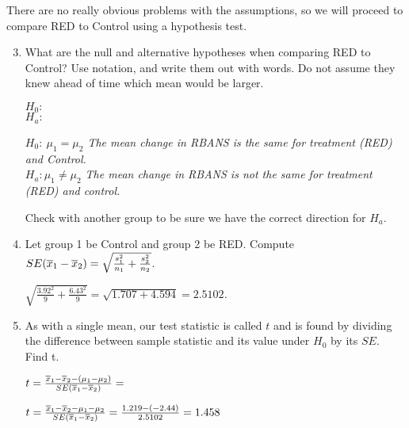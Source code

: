 There are no really obvious problems with the assumptions, so we will
proceed to compare RED to Control  using a hypothesis test.

\begin{enumerate}
\setcounter{enumi}{2}

\item  What are the null and alternative hypotheses when comparing RED
  to Control? Use notation, and write them out with words.
  Do not assume they knew ahead of time which  mean would be
  larger. \\
\begin{students}
 $H_0:$    \vspace{1cm}    \\ $H_a:$    \vspace{1cm}
\end{students}
\begin{key}
  {\it   $H_0:\ \mu_1 = \mu_2$ The mean change in RBANS is the same
    for treatment (RED) and Control.    \\ $H_a: \mu_1 \neq \mu_2$ The
    mean change in RBANS is not the same for treatment (RED) and control.  }
\end{key}

   Check with another group to be sure we have the correct
   direction for $H_a$.

\item  Let group 1 be Control and group 2 be RED. Compute $SE(\overline{x}_1 -
  \overline{x}_2) = \sqrt{\frac{s_1^2}{n_1} +     \frac{s_2^2}{n_2}}$. 
\begin{students}
    \vspace{2cm}    
\end{students}

\begin{key}
  {\it  $ \sqrt{\frac{3.92^2}{9} +    \frac{6.43^2}{9}} = \sqrt{1.707
    +4.594} = 2.5102$.} 
\end{key}
\item As with a single mean, our test statistic is called $t$ and is
  found by dividing  the difference between sample statistic and its
  value under $H_0$ by its $SE.$  Find t. \\
\begin{students}
  $ t = \frac{\overline{x}_1 - \overline{x}_2 - (\mu_1 - \mu_2)}{SE(\overline{x}_1-\overline{x}_2)} = $
    \vspace{2cm}    
\end{students}

\begin{key}
   $ t = \frac{\overline{x}_1 - \overline{x}_2 - \mu_1 - \mu_2}{SE(\overline{x}_1-\overline{x}_2)} = 
          \frac{ 1.219-( -2.44)}{2.5102} = 1.458 $
\end{key}


\end{enumerate}

